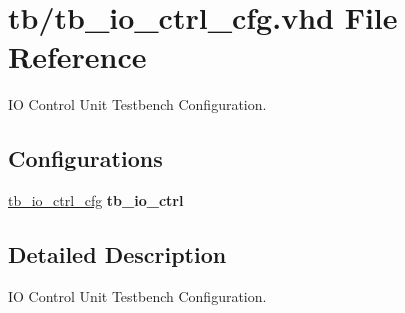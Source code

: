 \hypertarget{tb__io__ctrl__cfg_8vhd}{}\section{tb/tb\+\_\+io\+\_\+ctrl\+\_\+cfg.vhd File Reference}
\label{tb__io__ctrl__cfg_8vhd}


IO Control Unit Testbench Configuration.  


\subsection*{Configurations}
 \begin{DoxyCompactItemize}
\item 
\mbox{\label{tb__io__ctrl__cfg_8vhd_aa44e219cb284ff206422ccc36ce0373b}} 
\hyperlink{tb__io__ctrl__cfg_8vhd_aa44e219cb284ff206422ccc36ce0373b}{tb\+\_\+io\+\_\+ctrl\+\_\+cfg}  {\bfseries tb\+\_\+io\+\_\+ctrl}   
\end{DoxyCompactItemize}


\subsection{Detailed Description}
IO Control Unit Testbench Configuration. 

